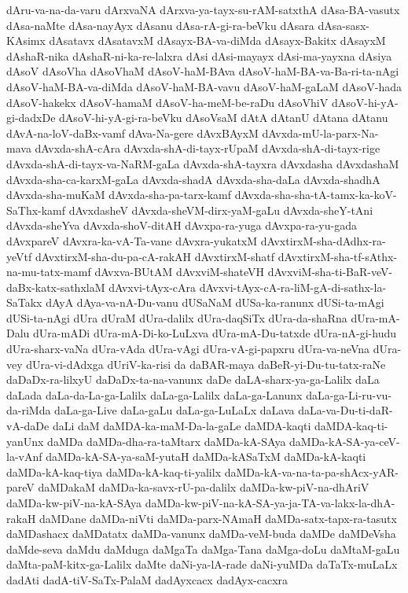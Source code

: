 {dAru-va-na-da-varu
dArxvaNA
dArxva-ya-tayx-su-rAM-satxthA
dAsa-BA-vasutx
dAsa-naMte
dAsa-nayAyx
dAsanu
dAsa-rA-gi-ra-beVku
dAsara
dAsa-sasx-KAsimx
dAsatavx
dAsatavxM
dAsayx-BA-va-diMda
dAsayx-Bakitx
dAsayxM
dAshaR-nika
dAshaR-ni-ka-re-lalxra
dAsi
dAsi-mayayx
dAsi-ma-yayxna
dAsiya
dAsoV
dAsoVha
dAsoVhaM
dAsoV-haM-BAva
dAsoV-haM-BA-va-Ba-ri-ta-nAgi
dAsoV-haM-BA-va-diMda
dAsoV-haM-BA-vavu
dAsoV-haM-gaLaM
dAsoV-hada
dAsoV-hakekx
dAsoV-hamaM
dAsoV-ha-meM-be-raDu
dAsoVhiV
dAsoV-hi-yA-gi-dadxDe
dAsoV-hi-yA-gi-ra-beVku
dAsoVsaM
dAtA
dAtanU
dAtana
dAtanu
dAvA-na-loV-daBx-vamf
dAva-Na-gere
dAvxBAyxM
dAvxda-mU-la-parx-Na-mava
dAvxda-shA-cAra
dAvxda-shA-di-tayx-rUpaM
dAvxda-shA-di-tayx-rige
dAvxda-shA-di-tayx-va-NaRM-gaLa
dAvxda-shA-tayxra
dAvxdasha
dAvxdashaM
dAvxda-sha-ca-karxM-gaLa
dAvxda-shadA
dAvxda-sha-daLa
dAvxda-shadhA
dAvxda-sha-muKaM
dAvxda-sha-pa-tarx-kamf
dAvxda-sha-sha-tA-tamx-ka-koV-SaThx-kamf
dAvxdasheV
dAvxda-sheVM-dirx-yaM-gaLu
dAvxda-sheY-tAni
dAvxda-sheYva
dAvxda-shoV-ditAH
dAvxpa-ra-yuga
dAvxpa-ra-yu-gada
dAvxpareV
dAvxra-ka-vA-Ta-vane
dAvxra-yukatxM
dAvxtirxM-sha-dAdhx-ra-yeVtf
dAvxtirxM-sha-du-pa-cA-rakAH
dAvxtirxM-shatf
dAvxtirxM-sha-tf-sAthx-na-mu-tatx-mamf
dAvxva-BUtAM
dAvxviM-shateVH
dAvxviM-sha-ti-BaR-veV-daBx-katx-sathxlaM
dAvxvi-tAyx-cAra
dAvxvi-tAyx-cA-ra-liM-gA-di-sathx-la-SaTakx
dAyA
dAya-va-nA-Du-vanu
dUSaNaM
dUSa-ka-ranunx
dUSi-ta-mAgi
dUSi-ta-nAgi
dUra
dUraM
dUra-dalilx
dUra-daqSiTx
dUra-da-shaRna
dUra-mA-Dalu
dUra-mADi
dUra-mA-Di-ko-LuLxva
dUra-mA-Du-tatxde
dUra-nA-gi-hudu
dUra-sharx-vaNa
dUra-vAda
dUra-vAgi
dUra-vA-gi-papxru
dUra-va-neVna
dUra-vey
dUra-vi-dAdxga
dUriV-ka-risi
da
daBAR-maya
daBeR-yi-Du-tu-tatx-raNe
daDaDx-ra-lilxyU
daDaDx-ta-na-vanunx
daDe
daLA-sharx-ya-ga-Lalilx
daLa
daLada
daLa-da-La-ga-Lalilx
daLa-ga-Lalilx
daLa-ga-Lanunx
daLa-ga-Li-ru-vu-da-riMda
daLa-ga-Live
daLa-gaLu
daLa-ga-LuLaLx
daLava
daLa-va-Du-ti-daR-vA-daDe
daLi
daM
daMDA-ka-maM-Da-la-gaLe
daMDA-kaqti
daMDA-kaq-ti-yanUnx
daMDa
daMDa-dha-ra-taMtarx
daMDa-kA-SAya
daMDa-kA-SA-ya-ceV-la-vAnf
daMDa-kA-SA-ya-saM-yutaH
daMDa-kASaTxM
daMDa-kA-kaqti
daMDa-kA-kaq-tiya
daMDa-kA-kaq-ti-yalilx
daMDa-kA-va-na-ta-pa-shAcx-yAR-pareV
daMDakaM
daMDa-ka-savx-rU-pa-dalilx
daMDa-kw-piV-na-dhAriV
daMDa-kw-piV-na-kA-SAya
daMDa-kw-piV-na-kA-SA-ya-ja-TA-va-lakx-la-dhA-rakaH
daMDane
daMDa-niVti
daMDa-parx-NAmaH
daMDa-satx-tapx-ra-tasutx
daMDashacx
daMDatatx
daMDa-vanunx
daMDa-veM-buda
daMDe
daMDeVsha
daMde-seva
daMdu
daMduga
daMgaTa
daMga-Tana
daMga-doLu
daMtaM-gaLu
daMta-paM-kitx-ga-Lalilx
daMte
daNi-ya-lA-rade
daNi-yuMDa
daTaTx-muLaLx
dadAti
dadA-tiV-SaTx-PalaM
dadAyxcacx
dadAyx-cacxra
}
